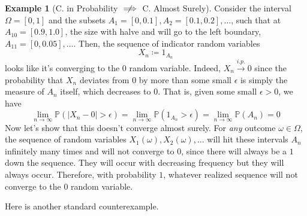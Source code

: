 \documentclass{article}
\theoremstyle{definition}
\newtheorem{example}{Example}[section]
\theoremstyle{remark}
\theoremstyle{definition}
\begin{document}
\begin{example}[C. in Probability $\centernot\implies$ C. Almost Surely]
Consider the interval $\Omega = [0, 1]$ and the subsets $A_1 = [0, 0.1], A_2 = [0.1, 0.2], \ldots$, such that at $A_{10} = [0.9, 1.0]$, the size with halve and will go to the left boundary, $A_{11} = [0, 0.05], \ldots$. Then, the sequence of indicator random variables 
\[X_n \coloneqq 1_{A_n}\]
looks like it's converging to the $0$ random variable. Indeed, $X_n \xrightarrow{i.p.} 0$ since the probability that $X_n$ deviates from $0$ by more than some small $\epsilon$ is simply the measure of $A_n$ itself, which decreases to $0$. That is, given some small $\epsilon > 0$, we have 
\[\lim_{n \rightarrow \infty} \mathbb{P} (|X_n - 0| > \epsilon) = \lim_{n \rightarrow \infty} \mathbb{P}(1_{A_n} > \epsilon ) = \lim_{n \rightarrow \infty} \mathbb{P}(A_n) = 0\]
Now let's show that this doesn't converge almost surely. For \textit{any} outcome $\omega \in \Omega$, the sequence of random variables $X_1(\omega), X_2(\omega), \ldots$ will hit these intervals $A_n$ infinitely many times and will not converge to $0$, since there will always be a $1$ down the sequence. They will occur with decreasing frequency but they will always occur. Therefore, with probability $1$, whatever realized sequence will not converge to the $0$ random variable. 
\end{example}

Here is another standard counterexample. 
\end{document}
